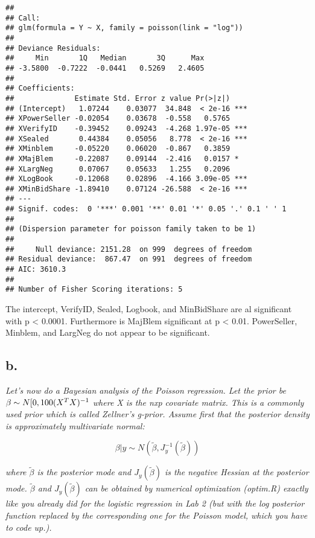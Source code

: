 \documentclass[]{article}
\begin{document}
\begin{verbatim}
## 
## Call:
## glm(formula = Y ~ X, family = poisson(link = "log"))
## 
## Deviance Residuals: 
##     Min       1Q   Median       3Q      Max  
## -3.5800  -0.7222  -0.0441   0.5269   2.4605  
## 
## Coefficients:
##              Estimate Std. Error z value Pr(>|z|)    
## (Intercept)   1.07244    0.03077  34.848  < 2e-16 ***
## XPowerSeller -0.02054    0.03678  -0.558   0.5765    
## XVerifyID    -0.39452    0.09243  -4.268 1.97e-05 ***
## XSealed       0.44384    0.05056   8.778  < 2e-16 ***
## XMinblem     -0.05220    0.06020  -0.867   0.3859    
## XMajBlem     -0.22087    0.09144  -2.416   0.0157 *  
## XLargNeg      0.07067    0.05633   1.255   0.2096    
## XLogBook     -0.12068    0.02896  -4.166 3.09e-05 ***
## XMinBidShare -1.89410    0.07124 -26.588  < 2e-16 ***
## ---
## Signif. codes:  0 '***' 0.001 '**' 0.01 '*' 0.05 '.' 0.1 ' ' 1
## 
## (Dispersion parameter for poisson family taken to be 1)
## 
##     Null deviance: 2151.28  on 999  degrees of freedom
## Residual deviance:  867.47  on 991  degrees of freedom
## AIC: 3610.3
## 
## Number of Fisher Scoring iterations: 5
\end{verbatim}

The intercept, VerifyID, Sealed, Logbook, and MinBidShare are al
significant with p \textless{} 0.0001. Furthermore is MajBlem
significant at p \textless{} 0.01. PowerSeller, Minblem, and LargNeg do
not appear to be significant.

\hypertarget{b.}{%
\subsection{b.}\label{b.}}

\emph{Let's now do a Bayesian analysis of the Poisson regression. Let
the prior be \(\beta\sim N[0,100\*(X^TX)^{-1}\) where X is the nxp
covariate matrix. This is a commonly used prior which is called
Zellner's g-prior. Assume first that the posterior density is
approximately multivariate normal:}

\[\beta|y\sim N(\tilde\beta, J_y^{-1}(\tilde\beta))\]

\emph{where \(\tilde\beta\) is the posterior mode and
\(J_y(\tilde\beta)\) is the negative Hessian at the posterior mode.
\(\tilde\beta\) and \(J_y(\tilde\beta)\) can be obtained by numerical
optimization (optim.R) exactly like you already did for the logistic
regression in Lab 2 (but with the log posterior function replaced by the
corresponding one for the Poisson model, which you have to code up.).}
\end{document}
